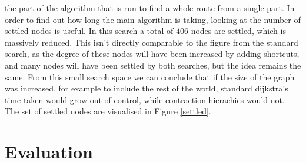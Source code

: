 \documentclass[11pt,twoside,a4paper]{report}
\begin{document}
the part of the algorithm that is run to find a whole route from a single part. In order to find out how long the main algorithm is taking, looking at the number of settled nodes is useful. In this search a total of $406$ nodes are settled, which is massively reduced. This isn't directly comparable to the figure from the standard search, as the degree
of these nodes will have been increased by adding shortcuts, and many nodes will have been settled by both searches,  but the idea remains the same. From this small search space we can conclude that if the size of the graph was increased, for example to include the rest of the world, standard dijkstra's time taken would grow out of control, while contraction hierachies would not. 
The set of settled nodes are visualised in Figure \ref{settled}.
\chapter{Evaluation}
\newpage
\appendix
\appendixpage
\addappheadtotoc
\end{document}
